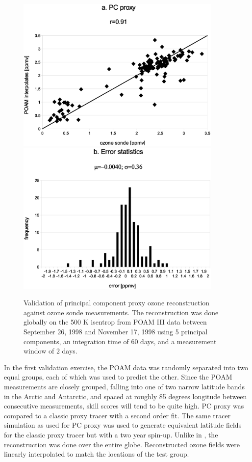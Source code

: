 \documentclass{article}
\begin{document}
\begin{figure}
  \centering
  \includegraphics[width=0.9\textwidth]{global_PC_sonde_scatter}
  \includegraphics[width=0.9\textwidth]{global_PC_sonde_error}
  \caption{Validation of principal component proxy ozone reconstruction against ozone sonde measurements. The reconstruction was done globally on the 500 K isentrop from POAM III data between September 26, 1998 and November 17, 1998 using 5 principal components,  an integration time of 60 days, and a measurement window of 2 days.}
  \label{global_PC_sonde}
\end{figure}

In the first validation exercise, the POAM data was randomly separated into two
equal groups, each of which was used to predict the other.
Since the POAM measurements are closely grouped, falling into one of two narrow
latitude bands in the Arctic and Antarctic, and spaced at roughly 85 degrees
longitude between consecutive measurements, skill scores will tend to be
quite high.
PC proxy was compared to a classic proxy tracer with a second order fit.
The same tracer simulation as used for PC proxy was used to generate 
equivalent latitude fields \citep{Allen_Nakamura2003} for the classic proxy
tracer but with a two year spin-up.
Unlike in \citet{Randall_etal2002}, the reconstruction was done over the entire
globe.
Reconstructed ozone fields were linearly interpolated to match the locations
of the test group.
\end{document}
